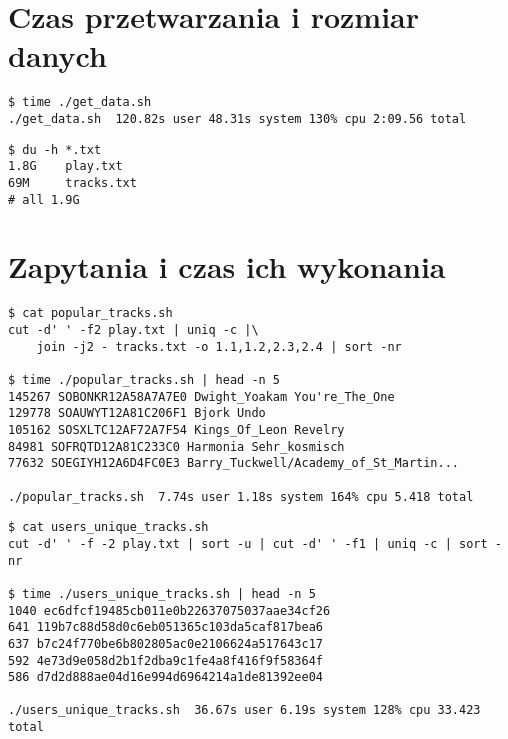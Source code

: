 \documentclass[a4paper,11pt]{article}
\begin{document}
\section{Czas przetwarzania i rozmiar danych}

\begin{verbatim}
$ time ./get_data.sh
./get_data.sh  120.82s user 48.31s system 130% cpu 2:09.56 total
\end{verbatim}

\begin{verbatim}
$ du -h *.txt
1.8G    play.txt
69M     tracks.txt
# all 1.9G
\end{verbatim}

\section{Zapytania i czas ich wykonania}

\begin{footnotesize}
\begin{verbatim}
$ cat popular_tracks.sh
cut -d' ' -f2 play.txt | uniq -c |\
    join -j2 - tracks.txt -o 1.1,1.2,2.3,2.4 | sort -nr

$ time ./popular_tracks.sh | head -n 5
145267 SOBONKR12A58A7A7E0 Dwight_Yoakam You're_The_One
129778 SOAUWYT12A81C206F1 Bjork Undo
105162 SOSXLTC12AF72A7F54 Kings_Of_Leon Revelry
84981 SOFRQTD12A81C233C0 Harmonia Sehr_kosmisch
77632 SOEGIYH12A6D4FC0E3 Barry_Tuckwell/Academy_of_St_Martin...

./popular_tracks.sh  7.74s user 1.18s system 164% cpu 5.418 total
\end{verbatim}
\end{footnotesize}




\begin{footnotesize}
\begin{verbatim}
$ cat users_unique_tracks.sh
cut -d' ' -f -2 play.txt | sort -u | cut -d' ' -f1 | uniq -c | sort -nr

$ time ./users_unique_tracks.sh | head -n 5
1040 ec6dfcf19485cb011e0b22637075037aae34cf26
641 119b7c88d58d0c6eb051365c103da5caf817bea6
637 b7c24f770be6b802805ac0e2106624a517643c17
592 4e73d9e058d2b1f2dba9c1fe4a8f416f9f58364f
586 d7d2d888ae04d16e994d6964214a1de81392ee04

./users_unique_tracks.sh  36.67s user 6.19s system 128% cpu 33.423 total
\end{verbatim}
\end{footnotesize}
\end{document}
